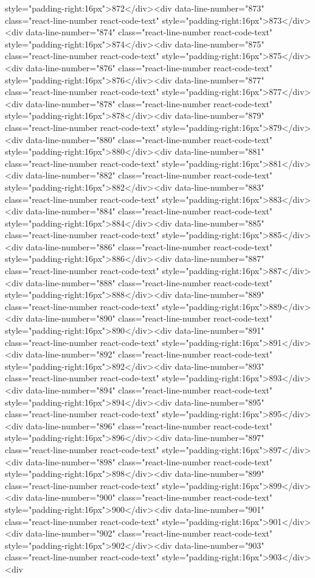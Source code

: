 style="padding-right:16px">872</div><div data-line-number="873" class="react-line-number react-code-text" style="padding-right:16px">873</div><div data-line-number="874" class="react-line-number react-code-text" style="padding-right:16px">874</div><div data-line-number="875" class="react-line-number react-code-text" style="padding-right:16px">875</div><div data-line-number="876" class="react-line-number react-code-text" style="padding-right:16px">876</div><div data-line-number="877" class="react-line-number react-code-text" style="padding-right:16px">877</div><div data-line-number="878" class="react-line-number react-code-text" style="padding-right:16px">878</div><div data-line-number="879" class="react-line-number react-code-text" style="padding-right:16px">879</div><div data-line-number="880" class="react-line-number react-code-text" style="padding-right:16px">880</div><div data-line-number="881" class="react-line-number react-code-text" style="padding-right:16px">881</div><div data-line-number="882" class="react-line-number react-code-text" style="padding-right:16px">882</div><div data-line-number="883" class="react-line-number react-code-text" style="padding-right:16px">883</div><div data-line-number="884" class="react-line-number react-code-text" style="padding-right:16px">884</div><div data-line-number="885" class="react-line-number react-code-text" style="padding-right:16px">885</div><div data-line-number="886" class="react-line-number react-code-text" style="padding-right:16px">886</div><div data-line-number="887" class="react-line-number react-code-text" style="padding-right:16px">887</div><div data-line-number="888" class="react-line-number react-code-text" style="padding-right:16px">888</div><div data-line-number="889" class="react-line-number react-code-text" style="padding-right:16px">889</div><div data-line-number="890" class="react-line-number react-code-text" style="padding-right:16px">890</div><div data-line-number="891" class="react-line-number react-code-text" style="padding-right:16px">891</div><div data-line-number="892" class="react-line-number react-code-text" style="padding-right:16px">892</div><div data-line-number="893" class="react-line-number react-code-text" style="padding-right:16px">893</div><div data-line-number="894" class="react-line-number react-code-text" style="padding-right:16px">894</div><div data-line-number="895" class="react-line-number react-code-text" style="padding-right:16px">895</div><div data-line-number="896" class="react-line-number react-code-text" style="padding-right:16px">896</div><div data-line-number="897" class="react-line-number react-code-text" style="padding-right:16px">897</div><div data-line-number="898" class="react-line-number react-code-text" style="padding-right:16px">898</div><div data-line-number="899" class="react-line-number react-code-text" style="padding-right:16px">899</div><div data-line-number="900" class="react-line-number react-code-text" style="padding-right:16px">900</div><div data-line-number="901" class="react-line-number react-code-text" style="padding-right:16px">901</div><div data-line-number="902" class="react-line-number react-code-text" style="padding-right:16px">902</div><div data-line-number="903" class="react-line-number react-code-text" style="padding-right:16px">903</div><div 